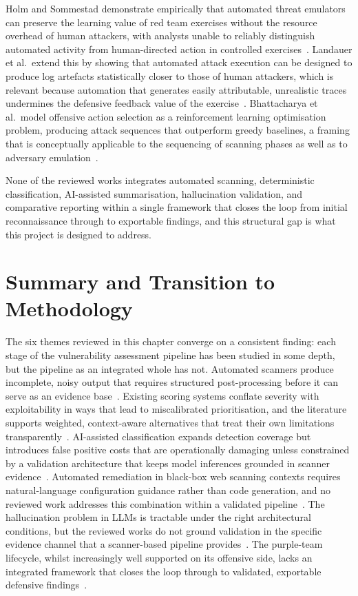 \documentclass[12pt, a4paper, oneside]{report}
\begin{document}
Holm and Sommestad demonstrate empirically that automated threat
emulators can preserve the learning value of red team exercises without
the resource overhead of human attackers, with analysts unable to
reliably distinguish automated activity from human-directed action in
controlled exercises~\cite{holm2025}. Landauer et al.\ extend this by
showing that automated attack execution can be designed to produce log
artefacts statistically closer to those of human attackers, which is
relevant because automation that generates easily attributable,
unrealistic traces undermines the defensive feedback value of the
exercise~\cite{landauer2026}. Bhattacharya et al.\ model offensive
action selection as a reinforcement learning optimisation problem,
producing attack sequences that outperform greedy baselines, a framing
that is conceptually applicable to the sequencing of scanning phases as
well as to adversary emulation~\cite{bhattacharya2020}.

None of the reviewed works integrates automated scanning, deterministic
classification, AI-assisted summarisation, hallucination validation, and
comparative reporting within a single framework that closes the loop from
initial reconnaissance through to exportable findings, and this structural
gap is what this project is designed to address.

\section{Summary and Transition to Methodology}

The six themes reviewed in this chapter converge on a consistent
finding: each stage of the vulnerability assessment pipeline has been
studied in some depth, but the pipeline as an integrated whole has not.
Automated scanners produce incomplete, noisy output that requires
structured post-processing before it can serve as an evidence
base~\cite{singh2024,althunayyan2022,abdulghaffar2023,redondo2019}.
Existing scoring systems conflate severity with exploitability in ways
that lead to miscalibrated prioritisation, and the literature supports
weighted, context-aware alternatives that treat their own limitations
transparently~\cite{howland2023,jacobs2023,koscinski2025}.
AI-assisted classification expands detection coverage but introduces
false positive costs that are operationally damaging unless constrained
by a validation architecture that keeps model inferences grounded in
scanner evidence~\cite{lin2025,chen2024,alahmadi2022}. Automated
remediation in black-box web scanning contexts requires natural-language
configuration guidance rather than code generation, and no reviewed work
addresses this combination within a validated
pipeline~\cite{bhandari2025,xu2025}. The hallucination problem in LLMs
is tractable under the right architectural conditions, but the reviewed
works do not ground validation in the specific evidence channel that a
scanner-based pipeline provides~\cite{farquhar2024,rawte2023,luo2025,hammar2026}.
The purple-team lifecycle, whilst increasingly well supported on its
offensive side, lacks an integrated framework that closes the loop
through to validated, exportable defensive
findings~\cite{hammar2026,holm2025,landauer2026}.
\end{document}
